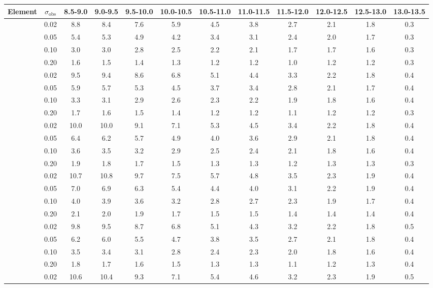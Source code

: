 \begin{tabular}{cccccccccccc}
\hline\hline
Element & $\sigma_\mathrm{obs}$  & 8.5-9.0 & 9.0-9.5 & 9.5-10.0 & 10.0-10.5 & 10.5-11.0 & 11.0-11.5 & 11.5-12.0 & 12.0-12.5 & 12.5-13.0 & 13.0-13.5 \\
\hline
[C/H] & 0.02 & 8.8 & 8.4 & 7.6 & 5.9 & 4.5 & 3.8 & 2.7 & 2.1 & 1.8 & 0.3 \\
 & 0.05 & 5.4 & 5.3 & 4.9 & 4.2 & 3.4 & 3.1 & 2.4 & 2.0 & 1.7 & 0.3 \\
 & 0.10 & 3.0 & 3.0 & 2.8 & 2.5 & 2.2 & 2.1 & 1.7 & 1.7 & 1.6 & 0.3 \\
 & 0.20 & 1.6 & 1.5 & 1.4 & 1.3 & 1.2 & 1.2 & 1.0 & 1.2 & 1.2 & 0.3 \\
\hline
[O/H] & 0.02 & 9.5 & 9.4 & 8.6 & 6.8 & 5.1 & 4.4 & 3.3 & 2.2 & 1.8 & 0.4 \\
 & 0.05 & 5.9 & 5.7 & 5.3 & 4.5 & 3.7 & 3.4 & 2.8 & 2.1 & 1.7 & 0.4 \\
 & 0.10 & 3.3 & 3.1 & 2.9 & 2.6 & 2.3 & 2.2 & 1.9 & 1.8 & 1.6 & 0.4 \\
 & 0.20 & 1.7 & 1.6 & 1.5 & 1.4 & 1.2 & 1.2 & 1.1 & 1.2 & 1.2 & 0.3 \\
\hline
[Mg/H] & 0.02 & 10.0 & 10.0 & 9.1 & 7.1 & 5.3 & 4.5 & 3.4 & 2.2 & 1.8 & 0.4 \\
 & 0.05 & 6.4 & 6.2 & 5.7 & 4.9 & 4.0 & 3.6 & 2.9 & 2.1 & 1.8 & 0.4 \\
 & 0.10 & 3.6 & 3.5 & 3.2 & 2.9 & 2.5 & 2.4 & 2.1 & 1.8 & 1.6 & 0.4 \\
 & 0.20 & 1.9 & 1.8 & 1.7 & 1.5 & 1.3 & 1.3 & 1.2 & 1.3 & 1.3 & 0.3 \\
\hline
[Al/H] & 0.02 & 10.7 & 10.8 & 9.7 & 7.5 & 5.7 & 4.8 & 3.5 & 2.3 & 1.9 & 0.4 \\
 & 0.05 & 7.0 & 6.9 & 6.3 & 5.4 & 4.4 & 4.0 & 3.1 & 2.2 & 1.9 & 0.4 \\
 & 0.10 & 4.0 & 3.9 & 3.6 & 3.2 & 2.8 & 2.7 & 2.3 & 1.9 & 1.7 & 0.4 \\
 & 0.20 & 2.1 & 2.0 & 1.9 & 1.7 & 1.5 & 1.5 & 1.4 & 1.4 & 1.4 & 0.4 \\
\hline
[Si/H] & 0.02 & 9.8 & 9.5 & 8.7 & 6.8 & 5.1 & 4.3 & 3.2 & 2.2 & 1.8 & 0.5 \\
 & 0.05 & 6.2 & 6.0 & 5.5 & 4.7 & 3.8 & 3.5 & 2.7 & 2.1 & 1.8 & 0.4 \\
 & 0.10 & 3.5 & 3.4 & 3.1 & 2.8 & 2.4 & 2.3 & 2.0 & 1.8 & 1.6 & 0.4 \\
 & 0.20 & 1.8 & 1.7 & 1.6 & 1.5 & 1.3 & 1.3 & 1.1 & 1.2 & 1.3 & 0.4 \\
\hline
[V/H] & 0.02 & 10.6 & 10.4 & 9.3 & 7.1 & 5.4 & 4.6 & 3.2 & 2.3 & 1.9 & 0.5 \\

\end{tabular}
